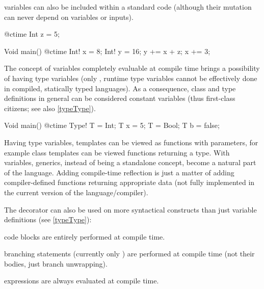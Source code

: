 \ctime variables can also be included within a standard code (although their mutation can never depend on \nonctime variables or inputs).

\begin{code}
@ctime Int z = 5;

Void main() {
	@ctime Int! x = 8;
	Int! y = 16;
	y += x + z;
	x += 3;
}
\end{code}

The concept of variables completely evaluable at compile time brings a possibility of having type variables (only \ctime, runtime type variables cannot be effectively done in compiled, statically typed languages). As a consequence, class and type definitions in general can be considered \ctime constant variables (thus first-class citizens; see also \autoref{typeType}).

\begin{code}
Void main() {
	@ctime Type! T = Int;
	T x = 5;
	T = Bool;
	T b = false;
}
\end{code}

Having type variables, templates can be viewed as functions with \ctime parameters, for example class templates can be viewed functions returning a type. With \ctime variables, generics, instead of being a standalone concept, become a natural part of the language. Adding compile-time reflection is just a matter of adding compiler-defined functions returning appropriate \ctime data (not fully implemented in the current version of the language/compiler).

The  decorator can also be used on more syntactical constructs than just variable definitions (see \autoref{typeType}):
\begin{compactitem}
	\item \ctime code blocks are entirely performed at compile time.
	\item \ctime branching statements (currently only ) are performed at compile time (not their bodies, just branch unwrapping).
	\item \ctime expressions are always evaluated at compile time.
\end{compactitem}

